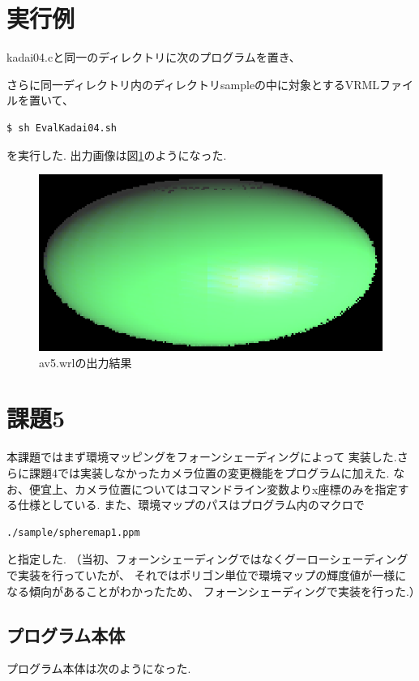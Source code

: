 \documentclass[a4j,dvipdfmx]{jsarticle}
\begin{document}
\section{実行例}
kadai04.cと同一のディレクトリに次のプログラムを置き、

さらに同一ディレクトリ内のディレクトリsampleの中に対象とするVRMLファイルを置いて、
\begin{lstlisting}
$ sh EvalKadai04.sh
\end{lstlisting}
を実行した.
出力画像は図\ref{fig:k4-av5}のようになった.
\begin{figure}[hp]
  \begin{center}
    \includegraphics[clip,scale=0.5]{images/Kadai04ForAv5.eps}
    \caption{av5.wrlの出力結果}
    \label{fig:k4-av5}
  \end{center}
\end{figure}

\section{課題5}
本課題ではまず環境マッピングをフォーンシェーディングによって
実装した.さらに課題4では実装しなかったカメラ位置の変更機能をプログラムに加えた.
なお、便宜上、カメラ位置についてはコマンドライン変数よりx座標のみを指定する仕様としている.
また、環境マップのパスはプログラム内のマクロで
\begin{verbatim}
./sample/spheremap1.ppm
\end{verbatim}
と指定した.
（当初、フォーンシェーディングではなくグーローシェーディングで実装を行っていたが、
  それではポリゴン単位で環境マップの輝度値が一様になる傾向があることがわかったため、
フォーンシェーディングで実装を行った.）
\subsection{プログラム本体}
プログラム本体は次のようになった.

\end{document}

